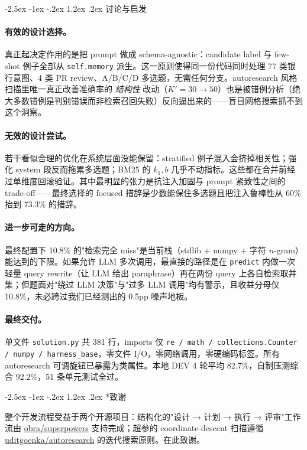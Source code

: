 \documentclass[11pt]{article}
\makeatletter
\renewcommand\section{\@startsection {section}{1}{\z@}%
  {-2.5ex \@plus -1ex \@minus -.2ex}%
  {1.2ex \@plus.2ex}%
  {\color{rule}\normalfont\large\bfseries}}
\makeatother
\begin{document}
\section{讨论与启发}

\paragraph{有效的设计选择。}
真正起决定作用的是把 prompt 做成 schema-agnostic：candidate label 与 few-shot 例子全部从 \texttt{self.memory} 派生。这一原则使得同一份代码同时处理 77 类银行意图、4 类 PR review、A/B/C/D 多选题，无需任何分支。autoresearch 风格扫描里唯一真正改善准确率的 \emph{结构性} 改动（$K'=30 \to 50$）也是被错例分析（绝大多数错例是判别错误而非检索召回失败）反向逼出来的——盲目网格搜索抓不到这个洞察。

\paragraph{无效的设计尝试。}
若干看似合理的优化在系统层面没能保留：stratified 例子混入会挤掉相关性；强化 system 段反而拖累多选题；BM25 的 $k_1, b$ 几乎不动指标。这些都在合并前经过单维度回滚验证。其中最明显的张力是抗注入加固与 prompt 紧致性之间的 trade-off——最终选择的 focused 措辞是少数能保住多选题且把注入鲁棒性从 60\% 抬到 73.3\% 的措辞。

\paragraph{进一步可走的方向。}
最终配置下 10.8\% 的"检索完全 miss"是当前栈（stdlib + numpy + 字符 $n$-gram）能达到的下限。如果允许 LLM 多次调用，最直接的路径是在 \texttt{predict} 内做一次轻量 query rewrite（让 LLM 给出 paraphrase）再在两份 query 上各自检索取并集；但题面对"绕过 LLM 决策"与"过多 LLM 调用"均有警示，且收益分母仅 10.8\%，未必跨过我们已经测出的 0.5pp 噪声地板。

\paragraph{最终交付。}
单文件 \texttt{solution.py} 共 381 行，imports 仅 \texttt{re / math / collections.Counter / numpy / harness\_base}，零文件 I/O，零网络调用，零硬编码标签。所有 autoresearch 可调旋钮已暴露为类属性。本地 DEV 4 轮平均 82.7\%，自制压测综合 92.2\%，51 条单元测试全过。

\section*{致谢}

整个开发流程受益于两个开源项目：结构化的"设计 → 计划 → 执行 → 评审"工作流由 \href{https://github.com/obra/superpowers}{obra/superpowers} 支持完成；超参的 coordinate-descent 扫描遵循 \href{https://github.com/uditgoenka/autoresearch}{uditgoenka/autoresearch} 的迭代搜索原则。在此致谢。
\end{document}
